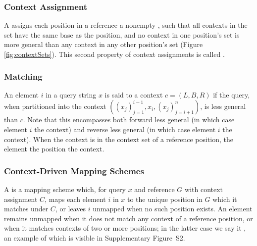\subsubsection{Context Assignment}
A  assigns each position in a reference a nonempty , such that all contexts in the set have the same base as the position, and no context in one position's set is more general than any context in any other position's set (Figure \ref{fig:contextSets}). This second property of context assignments is called .  

\subsubsection{Matching}
An element $i$ in a query string $x$ is said to  a context $c = (L, B, R)$ if the query, when partitioned into the context $((x_j)_{j=1}^{i-1}, x_i, (x_j)_{j=i+1}^n)$, is less general than $c$. Note that this encompasses both forward less general (in which case element $i$  the context) and reverse less general (in which case element $i$  the context). When the context is in the context set of a reference position, the element  the position  the context. 


\subsubsection{Context-Driven Mapping Schemes}
\begin{sloppypar}
A  is a mapping scheme which, for query $x$ and reference $G$ with context assignment $C$, maps each element $i$ in $x$ to the unique position in $G$ which it matches under $C$, or leaves $i$ unmapped when no such position exists. An element remains unmapped when it does not match any context of a reference position, or when it matches contexts of two or more positions; in the latter case we say it , an example of which is visible in Supplementary Figure~S2.
\end{sloppypar}


